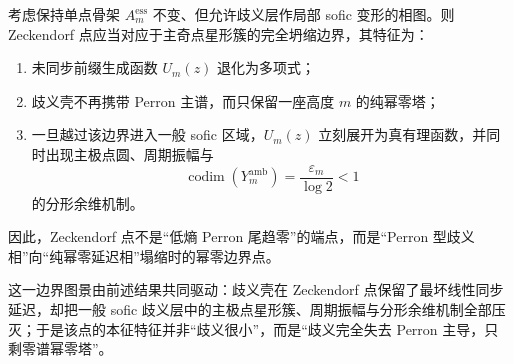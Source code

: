 \begin{conjecture}\label{conj:conclusion-zeckendorf-nilpotent-boundary-of-pole-star-phase}
考虑保持单点骨架 \(A_m^{\mathrm{ess}}\) 不变、但允许歧义层作局部 sofic 变形的相图。则 Zeckendorf 点应当对应于主奇点星形簇的完全坍缩边界，其特征为：
\begin{enumerate}
  \item 未同步前缀生成函数 \(U_m(z)\) 退化为多项式；
  \item 歧义壳不再携带 Perron 主谱，而只保留一座高度 \(m\) 的纯幂零塔；
  \item 一旦越过该边界进入一般 sofic 区域，\(U_m(z)\) 立刻展开为真有理函数，并同时出现主极点圆、周期振幅与
  \[
  \operatorname{codim}(Y_m^{\mathrm{amb}})=\frac{\varepsilon_m}{\log 2}<1
  \]
  的分形余维机制。
\end{enumerate}
因此，Zeckendorf 点不是“低熵 Perron 尾趋零”的端点，而是“Perron 型歧义相”向“纯幂零延迟相”塌缩时的幂零边界点。
\end{conjecture}

\noindent
这一边界图景由前述结果共同驱动：歧义壳在 Zeckendorf 点保留了最坏线性同步延迟，却把一般 sofic 歧义层中的主极点星形簇、周期振幅与分形余维机制全部压灭；于是该点的本征特征并非“歧义很小”，而是“歧义完全失去 Perron 主导，只剩零谱幂零塔”。
